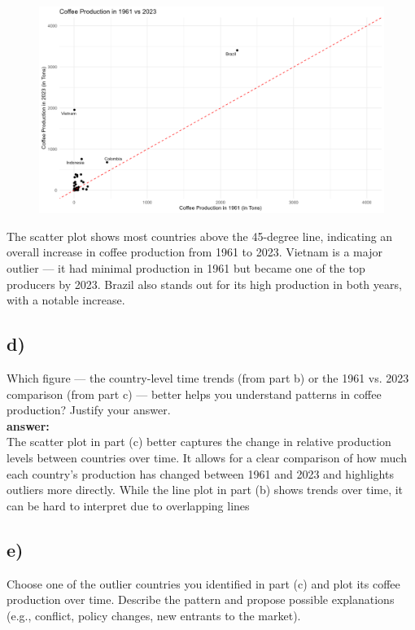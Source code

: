 \documentclass[12pt]{article}
\begin{document}
\begin{figure}[h]
    \centering
    \includegraphics[width=1\linewidth]{Figures/HW_2.2_c.png}
\end{figure}

The scatter plot shows most countries above the 45-degree line, indicating an overall increase in coffee production from 1961 to 2023. Vietnam is a major outlier — it had minimal production in 1961 but became one of the top producers by 2023. Brazil also stands out for its high production in both years, with a notable increase. 


\subsection*{d)} Which figure — the country-level time trends (from part b) or the 1961 vs. 2023 comparison (from part c) — better helps you understand patterns in coffee production? Justify your answer.\\ 


\textbf{answer:}\\


The scatter plot in part (c) better captures the change in relative production levels between countries over time. It allows for a clear comparison of how much each country’s production has changed between 1961 and 2023 and highlights outliers more directly. While the line plot in part (b) shows trends over time, it can be hard to interpret due to overlapping lines 


\subsection*{e)} Choose one of the outlier countries you identified in part (c) and plot its coffee production over time. Describe the pattern and propose possible explanations (e.g., conflict, policy changes, new entrants to the market).\\
\end{document}
